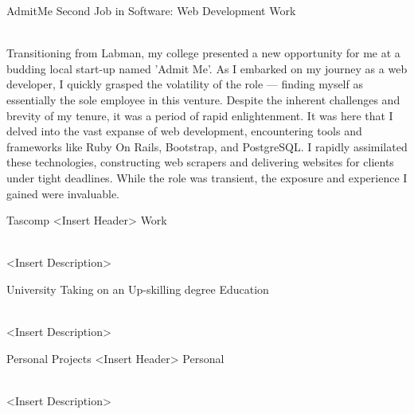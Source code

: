 \begin{entrylist}
{			\vspace{0.5cm}
			   
		}
	\entry
		{AdmitMe}
		{Second Job in Software: Web Development}
		{Work}
		{\\
			Transitioning from Labman, my college presented a new opportunity for me at a budding local start-up named 'Admit Me'. As I embarked on my journey as a web developer, I quickly grasped the volatility of the role — finding myself as essentially the sole employee in this venture. Despite the inherent challenges and brevity of my tenure, it was a period of rapid enlightenment. It was here that I delved into the vast expanse of web development, encountering tools and frameworks like Ruby On Rails, Bootstrap, and PostgreSQL. I rapidly assimilated these technologies, constructing web scrapers and delivering websites for clients under tight deadlines. While the role was transient, the exposure and experience I gained were invaluable.

			\vspace{0.5cm}

			  
		}
	\entry
		{Tascomp}
		{<Insert Header>}
		{Work}
		{\\
			<Insert Description>

			\vspace{0.5cm}
			       
		}
	\entry
		{University}
		{Taking on an Up-skilling degree}
		{Education}
		{\\
			<Insert Description>

			\vspace{0.5cm}
			   
		}
	\entry
		{Personal Projects}
		{<Insert Header>}
		{Personal}
		{\\
			<Insert Description>

			\vspace{0.5cm}
			         
		}
\end{entrylist}

\vspace{1cm}	